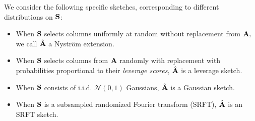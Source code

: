 \documentclass[xcolor=x11names,compress,ignorenonframetext,10pt]{beamer}
\renewcommand{\(}{\begin{columns}}
\renewcommand{\)}{\end{columns}}
\newcommand{\<}[1]{\begin{column}{#1}}
\renewcommand{\>}{\end{column}}
\begin{document}
% 
% 
% 
% 


\begin{frame}

We consider the following specific sketches, corresponding to different distributions on $\mathbf{S}$:
 \begin{itemize}
  \item When $\mathbf{S}$ selects columns uniformly at random without replacement from $\mathbf{A},$ 
   we call $\hat{\mathbf{A}}$ a \textcolor{dgreen}{Nystr\"om extension}.
  \item When $\mathbf{S}$ selects columns from $\mathbf{A}$ randomly with replacement with probabilities proportional to their 
   \emph{leverage scores}, $\hat{\mathbf{A}}$ is a \textcolor{dgreen}{leverage sketch}.
  \item When $\mathbf{S}$ consists of i.i.d. $\mathcal{N}(0,1)$ Gaussians, $\hat{\mathbf{A}}$ is a \textcolor{dgreen}{Gaussian sketch}.
  \item When $\mathbf{S}$ is a subsampled randomized Fourier transform (SRFT), $\hat{\mathbf{A}}$ is an \textcolor{dgreen}{SRFT sketch}.
 \end{itemize}

 \end{frame}
\end{document}
